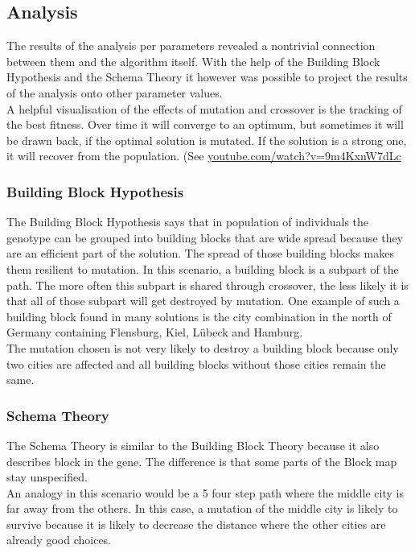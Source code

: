 \documentclass{scrartcl}
\begin{document}
\subsection{Analysis}
The results of the analysis per parameters revealed a nontrivial connection between them and the algorithm itself. With the help of the Building Block Hypothesis and the Schema Theory it however was possible to project the results of the analysis onto other parameter values.\\
A helpful visualisation of the effects of mutation and crossover is the tracking of the best fitness. Over time it will converge to an optimum, but sometimes it will be drawn back, if the optimal solution is mutated. If the solution is a strong one, it will recover from the population. (See \href{https://www.youtube.com/watch?v=9m4KxnW7dLc}{youtube.com/watch?v=9m4KxnW7dLc}

\subsubsection{Building Block Hypothesis}
The Building Block Hypothesis says that in population of individuals the genotype can be grouped into building blocks that are wide spread because they are an efficient part of the solution. The spread of those building blocks makes them resilient to mutation. In this scenario, a building block is a subpart of the path. The more often this subpart is shared through crossover, the less likely it is that all of those subpart will get destroyed by mutation. One example of such a building block found in many solutions is the city combination in the north of Germany containing Flensburg, Kiel, Lübeck and Hamburg.\\
The mutation chosen is not very likely to destroy a building block because only two cities are affected and all building blocks without those cities remain the same.
\subsubsection{Schema Theory}
The Schema Theory is similar to the Building Block Theory because it also describes block in the gene. The difference is that some parts of the Block map stay unspecified.\\
An analogy in this scenario would be a 5 four step path where the middle city is far away from the others. In this case, a mutation of the middle city is likely to survive because it is likely to decrease the distance where the other cities are already good choices.
 
\end{document}
